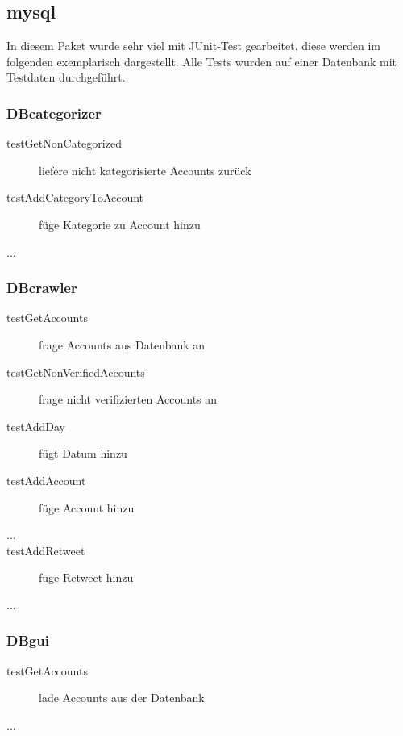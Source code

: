 \subsection{mysql}

In diesem Paket wurde sehr viel mit JUnit-Test gearbeitet, diese werden im folgenden exemplarisch dargestellt. Alle Tests wurden auf einer Datenbank mit Testdaten durchgeführt.
\subsubsection{DBcategorizer}
\quad
\begin{description}
	\item[testGetNonCategorized] liefere nicht kategorisierte Accounts zurück
	\item[testAddCategoryToAccount] füge Kategorie zu Account hinzu
	\item[...]
\end{description}
\subsubsection{DBcrawler}
\begin{description}
	\item[testGetAccounts] frage Accounts aus Datenbank an
	\item[testGetNonVerifiedAccounts] frage nicht verifizierten Accounts an
	\item[testAddDay] fügt Datum hinzu
	\item[testAddAccount] füge Account hinzu
	\item[...]
	\item[testAddRetweet] füge Retweet hinzu
	\item[...]	
\end{description}
\subsubsection{DBgui}
\begin{description}
	\item [testGetAccounts] lade Accounts aus der Datenbank
	\item [...]
\end{description}
\quad



